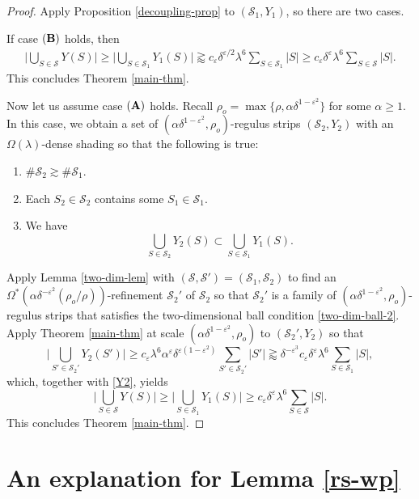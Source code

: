 \documentclass{amsart}%
\numberwithin{equation}{section}
\newcommand{\al}{\alpha}
\newcommand{\de}{\delta}
\newcommand{\e}{\varepsilon}
\newcommand{\la}{\lambda}
\newcommand{\Om}{\Omega}
\newcommand{\cs}{\mathcal S}
\newcommand{\1}{\mathbbm{1}}
\begin{document}
\begin{proof}
Apply Proposition \ref{decoupling-prop} to $(\cs_1, Y_1)$, so there are two cases.

\smallskip

If case $(\bf B)$ holds, then 
\begin{align}
    \Big|\bigcup_{S\in\cs}Y(S)\Big| \geq\Big|\bigcup_{S\in\cs_1}Y_1(S)\Big|\gtrapprox c_\e\de^{\e/2}\la^6\sum_{S\in\cs_1}|S|\geq c_\e\de^{\e}\la^6\sum_{S\in\cs}|S|.
\end{align}
This concludes Theorem \ref{main-thm}.

\smallskip

Now let us assume case $(\bf A)$ holds. 
Recall $\rho_o=\max\{\rho,\al\de^{1-\e^2}\}$ for some $\al\geq1$.
In this case, we obtain a set of $(\al\de^{1-\e^2}, \rho_o)$-regulus strips $(\cs_2, Y_2)$ with an $\Om(\la)$-dense shading so that the following is true:
\begin{enumerate}
    \item $\#\cs_2\gtrsim \#\cs_1$.
    \item Each $S_2\in\cs_2$ contains some $S_1\in\cs_1$.
    \item We have 
    \begin{equation}
    \label{Y2}
    \bigcup_{S\in\cs_2}Y_2(S)\subset \bigcup_{S\in\cs_1}Y_1(S).
    \end{equation}
\end{enumerate}

Apply Lemma \ref{two-dim-lem} with $(\cs,\cs')=(\cs_1,\cs_2)$ to find an $\Om^\ast(\al\de^{-\e^2}(\rho_o/\rho))$-refinement $\cs_2'$ of $\cs_2$ so that $\cs_2'$ is a family of $(\al\de^{1-\e^2},\rho_o)$-regulus strips that satisfies the two-dimensional ball condition \eqref{two-dim-ball-2}. 
Apply Theorem \ref{main-thm} at scale $(\al\de^{1-\e^2}, \rho_o)$ to $(\cs_2',Y_2)$ so that 
\begin{equation}
    \Big|\bigcup_{S'\in\cs_2'}Y_2(S')\Big|\geq c_\e\la^6\al^{\e}\de^{\e(1-\e^2)}\sum_{S'\in\cs_2'}|S'|\gtrapprox \de^{-\e^3}c_\e\de^\e\la^6\sum_{S\in\cs_1}|S|,
\end{equation}
which, together with \eqref{Y2}, yields
\begin{equation}
    \Big|\bigcup_{S\in\cs}Y(S)\Big| \geq\Big|\bigcup_{S\in\cs_1}Y_1(S)\Big|\geq c_\e\de^{\e}\la^6\sum_{S\in\cs}|S|.
\end{equation}
This concludes Theorem \ref{main-thm}.
\end{proof}


\bigskip 

\section{An explanation for Lemma \ref{rs-wp}}
\label{explanation}
\end{document}
